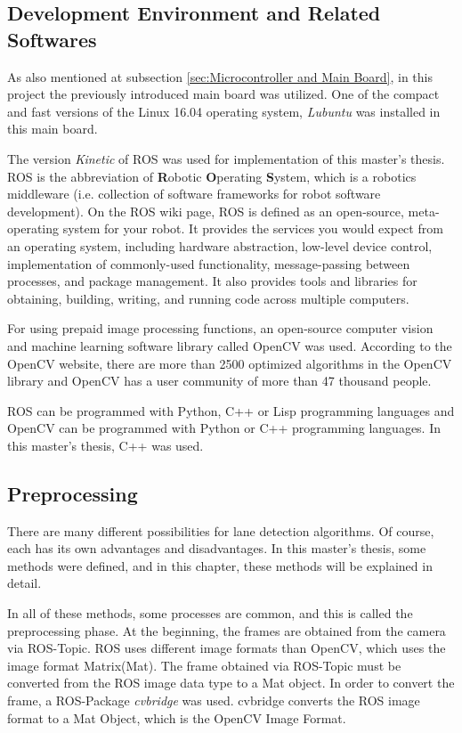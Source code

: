 %
\subsection{Development Environment and Related Softwares}
\label{sec:Development Environment and Related Softwares}

As also mentioned at subsection \ref{sec:Microcontroller and Main Board}, in this project the previously introduced main board was utilized. One of the compact and fast versions of the Linux 16.04 operating system, \textit{Lubuntu} was installed in this main board.

The version \textit{Kinetic} of ROS was used for implementation of this master's thesis. ROS is the abbreviation of \textbf{R}obotic \textbf{O}perating \textbf{S}ystem, which is a robotics middleware (i.e. collection of software frameworks for robot software development). On the ROS wiki page\cite{ROS}, ROS is defined as an open-source, meta-operating system for your robot. It provides the services you would expect from an operating system, including hardware abstraction, low-level device control, implementation of commonly-used functionality, message-passing between processes, and package management. It also provides tools and libraries for obtaining, building, writing, and running code across multiple computers.

For using prepaid image processing functions, an open-source computer vision and machine learning software library called OpenCV was used. According to the OpenCV website\cite{OpenCV}, there are more than 2500 optimized algorithms in the OpenCV library and OpenCV has a user community of more than 47 thousand people.

ROS can be programmed with Python, C++ or Lisp programming languages and OpenCV can be programmed with Python or C++ programming languages. In this master's thesis, C++ was used.

%
\subsection{Preprocessing}\label{sec:Preprocessing}

There are many different possibilities for lane detection algorithms. Of course, each has its own advantages and disadvantages. In this master's thesis, some methods were defined, and in this chapter, these methods will be explained in detail.

In all of these methods, some processes are common, and this is called the preprocessing phase. At the beginning, the frames are obtained from the camera via ROS-Topic. ROS uses different image formats than OpenCV, which uses the image format Matrix(Mat). The frame obtained via ROS-Topic must be converted from the ROS image data type to a Mat object. In order to convert the frame, a ROS-Package \textit{cvbridge}\cite{cv_bridge} was used. cvbridge converts the ROS image format to a Mat Object, which is the OpenCV Image Format. 

